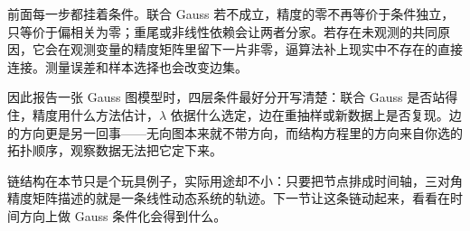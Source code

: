 前面每一步都挂着条件。联合 Gauss 若不成立，精度的零不再等价于条件独立，只等价于偏相关为零；重尾或非线性依赖会让两者分家。若存在未观测的共同原因，它会在观测变量的精度矩阵里留下一片非零，逼算法补上现实中不存在的直接连接。测量误差和样本选择也会改变边集。

因此报告一张 Gauss 图模型时，四层条件最好分开写清楚：联合 Gauss 是否站得住，精度用什么方法估计，\(\lambda\) 依据什么选定，边在重抽样或新数据上是否复现。边的方向更是另一回事——无向图本来就不带方向，而结构方程里的方向来自你选的拓扑顺序，观察数据无法把它定下来。

链结构在本节只是个玩具例子，实际用途却不小：只要把节点排成时间轴，三对角精度矩阵描述的就是一条线性动态系统的轨迹。下一节让这条链动起来，看看在时间方向上做 Gauss 条件化会得到什么。
